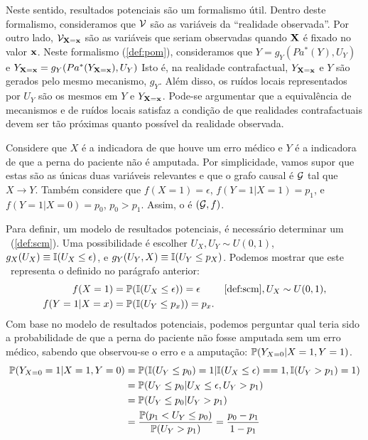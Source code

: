 Neste sentido, resultados potenciais são um formalismo útil.
Dentro deste formalismo, consideramos que 
$\sV$ são as variáveis da ``realidade observada''.
Por outro lado, $\sV_{\X=\x}$ são
as variáveis que seriam observadas quando
$\X$ é fixado no valor $\x$.
Neste formalismo (\cref{def:pom}), consideramos que
$Y = g_Y(Pa^*(Y), U_Y)$ e
$Y_{\X=\x} = g_Y(Pa^*(Y_{\X=\x}), U_Y)$
Isto é, na realidade contrafactual,
$Y_{\X=\x}$ e $Y$ são gerados pelo mesmo mecanismo, $g_Y$.
Além disso, os ruídos locais representados por $U_Y$ são
os mesmos em $Y$ e $Y_{\X=\x}$.
Pode-se argumentar que a equivalência de mecanismos
e de ruídos locais satisfaz a condição de que
realidades contrafactuais devem ser
tão próximas quanto possível da realidade observada.

\begin{example}
 \label{ex:contrafactual_1}
 Considere que $X$ é a indicadora de que houve um erro médico e
 $Y$ é a indicadora de que a perna do paciente não é amputada.
 Por simplicidade, vamos supor que estas são
 as únicas duas variáveis relevantes e que 
 o grafo causal é $\sG$ tal que $X \rightarrow Y$.
 Também considere que $f(X = 1) = \epsilon$,
 $f(Y=1|X=1) = p_1$, e $f(Y=1|X=0) = p_0$, $p_0 > p_1$.
 Assim, o \CM é $(\sG, f)$. 
 
 Para definir, um modelo de resultados potenciais,
 é necessário determinar um \SCM \ (\cref{def:scm}).
 Uma possibilidade é escolher $U_X, U_Y \sim U(0,1)$,
 $g_X(U_X) \equiv \I(U_X \leq \epsilon)$, e
 $g_Y(U_Y, X) \equiv \I(U_Y \leq p_X)$.
 Podemos mostrar que este \SCM \ representa
 o \CM definido no parágrafo anterior:
 \begin{align*}
  f(X=1)
  &= \P(\I(U_X \leq \epsilon)) = \epsilon
  & \text{\cref{def:scm}}, U_X \sim U(0,1), \\
  f(Y=1|X=x)
  &= \P(\I(U_Y \leq p_x)) = p_x.
 \end{align*}
 Com base no modelo de resultados potenciais,
 podemos perguntar qual teria sido a probabilidade
 de que a perna do paciente não fosse amputada sem
 um erro médico, sabendo que observou-se
 o erro e a amputação: $\P(Y_{X=0}|X=1,Y=1)$.
 \begin{align*}
  \P(Y_{X=0}=1|X=1,Y=0)
  &= \P(\I(U_Y \leq p_0) = 1|\I(U_X \leq \epsilon) == 1, \I(U_Y > p_1) = 1) \\
  &= \P(U_Y \leq p_0|U_X \leq \epsilon, U_Y > p_1) \\
  &= \P(U_Y \leq p_0|U_Y > p_1) \\
  &= \frac{\P(p_1 < U_Y \leq p_0)}{\P(U_Y > p_1)} = \frac{p_0-p_1}{1-p_1}
 \end{align*}
\end{example}

